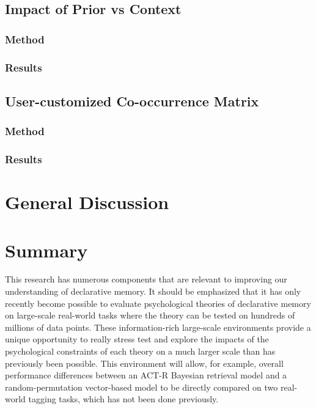 \documentclass[man,floatsintext,donotrepeattitle]{apa6}
\begin{document}
\subsection{Impact of Prior vs Context}

\subsubsection{Method}
\subsubsection{Results}

\subsection{User-customized Co-occurrence Matrix}

\subsubsection{Method}
\subsubsection{Results}

\section{General Discussion}

\section{Summary}

This research has numerous components that are relevant to improving our understanding of declarative memory.
It should be emphasized that it has only recently become possible to evaluate psychological theories of declarative memory on large-scale real-world tasks where the theory can be tested on hundreds of millions of data points.
These information-rich large-scale environments provide a unique opportunity to really stress test and explore the impacts of the psychological constraints of each theory
on a much larger scale than has previously been possible.
This environment will allow, for example, overall performance differences between an ACT-R Bayesian retrieval model and a random-permutation vector-based model to be directly compared on two real-world tagging tasks,
which has not been done previously.
\end{document}
